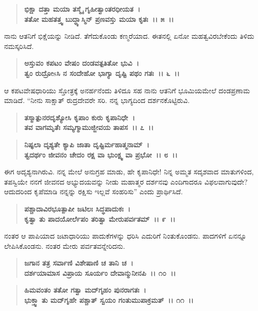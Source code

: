 \begin{verse}
\textbf{ಭಿಕ್ಷಾ ದತ್ತಾ ಮಯಾ ತಸ್ಮೈ ಗೃಹೀತ್ವಾಂತರಧೀಯತ~।}\\\textbf{ತತೋ ಮಹತತ್ತ್ವ ಬುದ್ಧ್ಯಾಸ್ಮಿನ್ ಪ್ರಣವಸ್ತು ಮಯಾ ಕೃತಃ~।। ೫~।।}
\end{verse}

ನಾನು ಆತನಿಗೆ ಭಿಕ್ಷೆಯನ್ನು ನೀಡಿದೆ. ತೆಗೆದುಕೊಂಡು ಕಣ್ಮರೆಯಾದ. ಈತನಲ್ಲಿ ಏನೋ ಮಹತ್ವವಿರಬೇಕೆಂದು ತಿಳಿದು ನಮಸ್ಕರಿಸಿದೆ.

\begin{verse}
\textbf{ಅಸ್ತುವಂ ಕಪಟಂ ವೇಷಂ ದಂಡವತ್ಪತಿತೋ ಭುವಿ~।}\\\textbf{ತ್ವಂ ರುದ್ರೋsಸಿ ನ ಸಂದೇಹೋ ಭಾಗ್ಯಾ ದೃಷ್ಟಿ ಪಥಂ ಗತಃ~।। ೬~।।}
\end{verse}

ಆ ಕಪಟವೇಷಧಾರಿಯು ಸ್ತೋತ್ರಕ್ಕೆ ಅನರ್ಹನೆಂದು ತಿಳಿದೂ ಸಹ ನಾನು ಆತನಿಗೆ ಭೂಮಿಯಮೇಲೆ ದಂಡಪ್ರಣಾಮ ಮಾಡಿದೆ. “ನೀನು ಸಾಕ್ಷಾತ್ ರುದ್ರದೇವರೇ ಸರಿ. ನನ್ನ ಭಾಗ್ಯದಿಂದ ದರ್ಶನಕೊಟ್ಟಿರುವಿ.

\begin{verse}
\textbf{ತಸ್ಮಾತ್ಪುನರದೃಶ್ಯೋಸಿ ಕೃಪಾಂ ಕುರು ಕೃಪಾನಿಧೇ~।}\\\textbf{ತವ ವಾಗಮೃತೆಃ ಸಮ್ಯಗ್ಮಾಮುಜ್ಜೀವಯ ತಾಪಸ~।। ೭~।।} 
\end{verse}

\begin{verse}
\textbf{ನಿಷ್ಫಲಾ ದೃಶ್ಯತೇ ಕ್ಯಾಪಿ ಜಾತಾ ದೃಷ್ಟಿರ್ಮಹಾತ್ಮನಾಮ್~।}\\\textbf{ತ್ವದರ್ಥಂ ಜೀವನಂ ಚೇದಂ ರಕ್ಷ ವಾ ಭುಂಕ್ಷ್ವ ವಾ ಪ್ರಭೋ~।। ೮~।।}
\end{verse}

ಈಗ ಅದೃಶ್ಯನಾಗಿರುವಿ. ನನ್ನ ಮೇಲೆ ಅನುಗ್ರಹ ಮಾಡು, ಹೇ ಕೃಪಾನಿಧೇ! ನಿನ್ನ ಅಮ್ಮತ ಸದೃಶವಾದ ಮಾತುಗಳಿಂದ, ತಪಸ್ವಿಯೇ ನನಗೆ ಜೀವನದ ಅಭ್ಯುದಯವನ್ನು ನೀಡು ಮಹಾತ್ಮರ ದರ್ಶನವು ಎಂದಿಗಾದರೂ ವಿಫಲವಾಗುವುದೇ? ಆದುದರಿಂದ ಕೃಪೆಮಾಡಿ ನನ್ನನ್ನು ರಕ್ಷಿಸು ಇಲ್ಲವೆ ಸಂಹರಿಸು” ಎಂದು ಪ್ರಾರ್ಥಿಸಿದೆ.

\begin{verse}
\textbf{ಪಶ್ಚಾದಾವಿರಭೂತ್ಪಾಪೀ ಜಟಿಲಃ ಸಿದ್ಧಪಾದುಕಃ~।}\\\textbf{ಕೃತ್ವಾ ತು ಪಾದಯೋರ್ಲೆಪಂ ತರಿತ್ವಾ ಮೇರುಪರ್ವತಮ್~।। ೯~।।}
\end{verse}

ನಂತರ ಆ ಪಾಪಿಯಾದ ಜಟಾಧಾರಿಯು ಪಾದುಕೆಗಳನ್ನು ಧರಿಸಿ ಎದುರಿಗೆ ನಿಂತುಕೊಂಡನು. ಪಾದಗಳಿಗೆ ಏನನ್ನೂ ಲೇಪಿಸಿಕೊಂಡನು. ನಂತರ ಮೇರು ಪರ್ವತವನ್ನೇರಿದನು.

\begin{verse}
\textbf{ಜಗಾನ ತತ್ರ ಸರ್ವಾಣಿ ವಿಶೇಷಾಣಿ ಚ ತಾನಿ ಚ~।}\\\textbf{ದರ್ಶಯಾಮಾಸ ವಿಪ್ರಾಯ ಸೂರ್ಯಂ ದೇವಾನ್ಮುನೀನಪಿ~।। ೧೦~।। }
\end{verse}

\begin{verse}
\textbf{ಹಿಮವಂತಂ ತತೋ ಗತ್ವಾ ಮದ್‌ಗೃಹಂ ಪುನರಾಗತಃ~।}\\\textbf{ಭುಕ್ತ್ವಾ ತು ಮದ್‌ಗೃಹೇ ಪಶ್ಚಾತ್ ಸ್ವಯಂ ಗಂತುಮುಪಾಕ್ರಮತ್~।। ೧೧~।।}
\end{verse}

